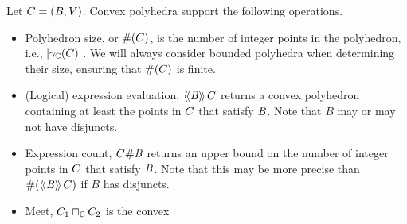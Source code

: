 \newcommand{\myitem}{~\\ \noindent $\bullet$ }
Let $ C = (B, V) $. Convex polyhedra support the following
operations.
\begin{itemize}
\item Polyhedron size, or $ \#(C) $, is the number of
   integer points in the polyhedron, i.e., $\left| \gamma_{\mathbb{C}}(C) \right|$.
   We will always consider bounded polyhedra when determining their
   size, ensuring that $\#(C)$ is finite.
\item (Logical) expression evaluation, $\langle\!\langle{\mathit{B}}\rangle\!\rangle\,{C}$ returns a
   convex polyhedron containing at least the points in $C$ that satisfy
$\mathit{B}$. Note that $ B $ may or may not have disjuncts.
\item Expression count, $C \# \mathit{B}$ returns an upper bound
 on the number of integer points in $C$ that satisfy $\mathit{B}$. Note
 that this may be more precise than $\#(\langle\!\langle{\mathit{B}}\rangle\!\rangle\,{C})$
 if $ B $ has disjuncts.
 \item Meet, $ C_1 \sqcap_{\mathbb{C}} C_2 $ is the convex

\end{itemize}
